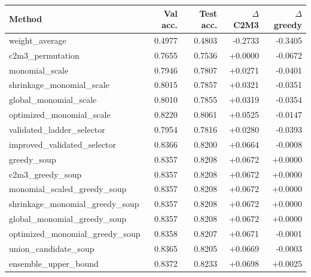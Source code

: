 \begin{tabular}{lrrrr}
\toprule
Method & Val acc. & Test acc. & $\Delta$ C2M3 & $\Delta$ greedy \\
\midrule
weight\_average & 0.4977 & 0.4803 & -0.2733 & -0.3405 \\
c2m3\_permutation & 0.7655 & 0.7536 & +0.0000 & -0.0672 \\
monomial\_scale & 0.7946 & 0.7807 & +0.0271 & -0.0401 \\
shrinkage\_monomial\_scale & 0.8015 & 0.7857 & +0.0321 & -0.0351 \\
global\_monomial\_scale & 0.8010 & 0.7855 & +0.0319 & -0.0354 \\
optimized\_monomial\_scale & 0.8220 & 0.8061 & +0.0525 & -0.0147 \\
validated\_ladder\_selector & 0.7954 & 0.7816 & +0.0280 & -0.0393 \\
improved\_validated\_selector & 0.8366 & 0.8200 & +0.0664 & -0.0008 \\
greedy\_soup & 0.8357 & 0.8208 & +0.0672 & +0.0000 \\
c2m3\_greedy\_soup & 0.8357 & 0.8208 & +0.0672 & +0.0000 \\
monomial\_scaled\_greedy\_soup & 0.8357 & 0.8208 & +0.0672 & +0.0000 \\
shrinkage\_monomial\_greedy\_soup & 0.8357 & 0.8208 & +0.0672 & +0.0000 \\
global\_monomial\_greedy\_soup & 0.8357 & 0.8208 & +0.0672 & +0.0000 \\
optimized\_monomial\_greedy\_soup & 0.8358 & 0.8207 & +0.0671 & -0.0001 \\
union\_candidate\_soup & 0.8365 & 0.8205 & +0.0669 & -0.0003 \\
ensemble\_upper\_bound & 0.8372 & 0.8233 & +0.0698 & +0.0025 \\
\bottomrule
\end{tabular}

